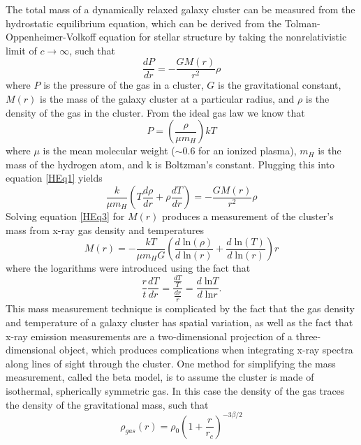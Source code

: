 \documentclass[a4paper,12pt]{article}
\begin{document}
The total mass of a dynamically relaxed galaxy cluster can be measured from the hydrostatic equilibrium equation, which can be derived from the Tolman-Oppenheimer-Volkoff equation for stellar structure by taking the nonrelativistic  limit of $c \rightarrow \infty$, such that 
\begin{equation} \label{HEq1}
\frac{dP}{dr} = -\frac{GM(r)}{r^2}\rho
\end{equation}
where $P$ is the pressure of the gas in a cluster, $G$ is the gravitational constant, $M(r)$ is the mass of the galaxy cluster at a particular radius, and $\rho$ is the density of the gas in the cluster.  From the ideal gas law we know that
\begin{equation} \label{HEq2}
P=\left(\frac{\rho}{\mu m_H}\right)kT
\end{equation}
where $\mu$ is the mean molecular weight ($\sim$0.6 for an ionized plasma), $m_H$ is the mass of the hydrogen atom, and k is Boltzman's constant.  Plugging this into equation \ref{HEq1} yields
\begin{equation} \label{HEq3}
\frac{k}{\mu m_H}\left(T\frac{d\rho}{dr} + \rho\frac{dT}{dr} \right)=-\frac{GM(r)}{r^2}\rho
\end{equation}
Solving equation \ref{HEq3} for $M(r)$ produces a measurement of the cluster's mass from x-ray gas density and temperatures
\begin{equation} \label{HEq4}
M(r) = -\frac{kT}{\mu m_H G}\left(\frac{d \; \text{ln}(\rho)}{d \; \text{ln}(r)} + \frac{d \; \text{ln}(T)}{d \; \text{ln}(r)}\right)r
\end{equation}
where the logarithms were introduced using the fact that 
\begin{equation}
\frac{r}{t}\frac{dT}{dr}=\frac{\frac{dT}{T}}{\frac{dr}{r}}=\frac{ d \; \text{ln}{T}}{d \; \text{ln}{r} }.
\end{equation} 
This mass measurement technique is complicated by the fact that the gas density and temperature of a galaxy cluster has spatial variation, as well as the fact that x-ray emission measurements are a two-dimensional projection of a three-dimensional object, which  produces complications when integrating x-ray spectra along lines of sight through the cluster. One method for simplifying the mass measurement, called the beta model, is to assume the cluster is made of isothermal, spherically symmetric gas.  In this case the density of the gas traces the density of the gravitational mass, such that
\begin{equation} \label{HBeta1}
\rho_{gas}(r) = \rho_0 \left(1 + \frac{r}{r_c}\right)^{-3\beta/2}
\end{equation}
\end{document}
